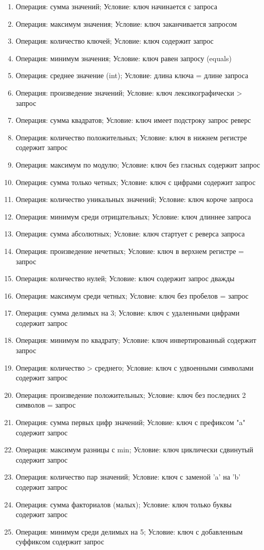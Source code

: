 \documentclass[12pt]{article}
\begin{document}
  \begin{enumerate}
    \item Операция: сумма значений; Условие: ключ начинается с запроса
    \item Операция: максимум значения; Условие: ключ заканчивается запросом
    \item Операция: количество ключей; Условие: ключ содержит запрос
    \item Операция: минимум значения; Условие: ключ равен запросу (equals)
    \item Операция: среднее значение (int); Условие: длина ключа = длине запроса
    \item Операция: произведение значений; Условие: ключ лексикографически > запрос
    \item Операция: сумма квадратов; Условие: ключ имеет подстроку запрос реверс
    \item Операция: количество положительных; Условие: ключ в нижнем регистре содержит запрос
    \item Операция: максимум по модулю; Условие: ключ без гласных содержит запрос
    \item Операция: сумма только четных; Условие: ключ с цифрами содержит запрос
    \item Операция: количество уникальных значений; Условие: ключ короче запроса
    \item Операция: минимум среди отрицательных; Условие: ключ длиннее запроса
    \item Операция: сумма абсолютных; Условие: ключ стартует с реверса запроса
    \item Операция: произведение нечетных; Условие: ключ в верхнем регистре = запрос
    \item Операция: количество нулей; Условие: ключ содержит запрос дважды
    \item Операция: максимум среди четных; Условие: ключ без пробелов = запрос
    \item Операция: сумма делимых на 3; Условие: ключ с удаленными цифрами содержит запрос
    \item Операция: минимум по квадрату; Условие: ключ инвертированный содержит запрос
    \item Операция: количество > среднего; Условие: ключ с удвоенными символами содержит запрос
    \item Операция: произведение положительных; Условие: ключ без последних 2 символов = запрос
    \item Операция: сумма первых цифр значений; Условие: ключ с префиксом "a" содержит запрос
    \item Операция: максимум разницы с min; Условие: ключ циклически сдвинутый содержит запрос
    \item Операция: количество пар значений; Условие: ключ с заменой 'a' на 'b' содержит запрос
    \item Операция: сумма факториалов (малых); Условие: ключ только буквы содержит запрос
    \item Операция: минимум среди делимых на 5; Условие: ключ с добавленным суффиксом содержит запрос
  \end{enumerate}
\end{document}
